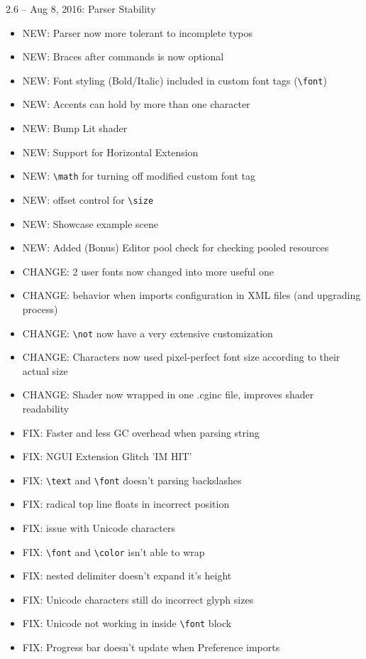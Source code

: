 \documentclass[12pt]{article}
\begin{document}
2.6 – Aug 8, 2016: Parser Stability
\begin{itemize}
\item NEW: Parser now more tolerant to incomplete typos
\item NEW: Braces after commands is now optional
\item NEW: Font styling (Bold/Italic) included in custom font tags (\verb|\font|)
\item NEW: Accents can hold by more than one character
\item NEW: Bump Lit shader
\item NEW: Support for Horizontal Extension
\item NEW: \verb|\math| for turning off modified custom font tag
\item NEW: offset control for \verb|\size|
\item NEW: Showcase example scene
\item NEW: Added (Bonus) Editor pool check for checking pooled resources
\item CHANGE: 2 user fonts now changed into more useful one
\item CHANGE: behavior when imports configuration in XML files (and upgrading process)
\item CHANGE: \verb|\not| now have a very extensive customization
\item CHANGE: Characters now used pixel-perfect font size according to their actual size
\item CHANGE: Shader now wrapped in one .cginc file, improves shader readability
\item FIX: Faster and less GC overhead when parsing string
\item FIX: NGUI Extension Glitch 'IM HIT'
\item FIX: \verb|\text| and \verb|\font| doesn't parsing backslashes
\item FIX: radical top line floats in incorrect position
\item FIX: issue with Unicode characters
\item FIX: \verb|\font| and \verb|\color| isn’t able to wrap
\item FIX: nested delimiter doesn't expand it's height
\item FIX: Unicode characters still do incorrect glyph sizes
\item FIX: Unicode not working in inside \verb|\font| block
\item FIX: Progress bar doesn’t update when Preference imports
\end{itemize}
\end{document}
